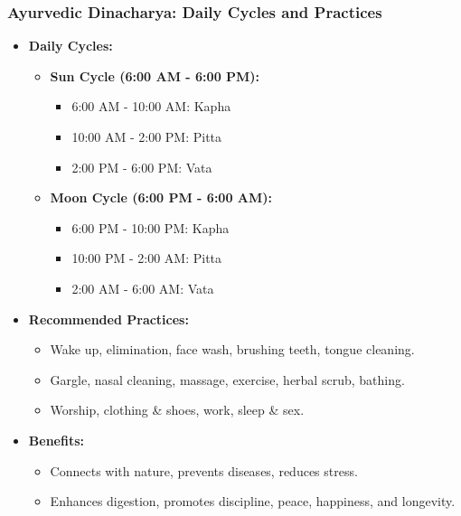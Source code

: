 \begin{frame}[fragile]\frametitle{Ayurvedic Dinacharya: Daily Cycles and Practices}

      \begin{itemize}
        \item \textbf{Daily Cycles:}
        \begin{itemize}
            \item \textbf{Sun Cycle (6:00 AM - 6:00 PM):}
            \begin{itemize}
                \item 6:00 AM - 10:00 AM: Kapha
                \item 10:00 AM - 2:00 PM: Pitta
                \item 2:00 PM - 6:00 PM: Vata
            \end{itemize}
            \item \textbf{Moon Cycle (6:00 PM - 6:00 AM):}
            \begin{itemize}
                \item 6:00 PM - 10:00 PM: Kapha
                \item 10:00 PM - 2:00 AM: Pitta
                \item 2:00 AM - 6:00 AM: Vata
            \end{itemize}
        \end{itemize}
        \item \textbf{Recommended Practices:}
        \begin{itemize}
            \item Wake up, elimination, face wash, brushing teeth, tongue cleaning.
            \item Gargle, nasal cleaning, massage, exercise, herbal scrub, bathing.
            \item Worship, clothing \& shoes, work, sleep \& sex.
        \end{itemize}
        \item \textbf{Benefits:} 
        \begin{itemize}
            \item Connects with nature, prevents diseases, reduces stress.
            \item Enhances digestion, promotes discipline, peace, happiness, and longevity.
        \end{itemize}
      \end{itemize}

\end{frame}


